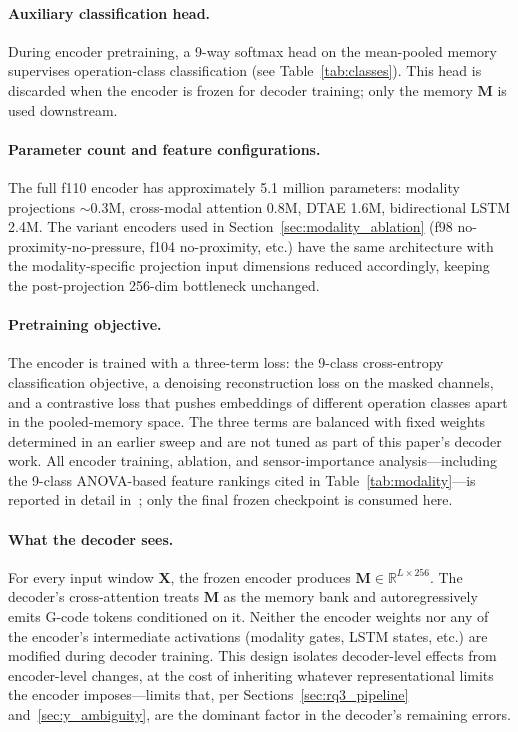 \documentclass[sensors,article,submit,moreauthors,pdftex]{Definitions/mdpi}
\begin{document}
\paragraph{Auxiliary classification head.} During encoder pretraining, a 9-way softmax head on the mean-pooled memory supervises operation-class classification (see Table~\ref{tab:classes}). This head is discarded when the encoder is frozen for decoder training; only the memory $\mathbf{M}$ is used downstream.

\paragraph{Parameter count and feature configurations.} The full f110 encoder has approximately 5.1 million parameters: modality projections $\sim$0.3M, cross-modal attention 0.8M, DTAE 1.6M, bidirectional LSTM 2.4M. The variant encoders used in Section~\ref{sec:modality_ablation} (f98 no-proximity-no-pressure, f104 no-proximity, etc.) have the same architecture with the modality-specific projection input dimensions reduced accordingly, keeping the post-projection 256-dim bottleneck unchanged.

\paragraph{Pretraining objective.} The encoder is trained with a three-term loss: the 9-class cross-entropy classification objective, a denoising reconstruction loss on the masked channels, and a contrastive loss that pushes embeddings of different operation classes apart in the pooled-memory space. The three terms are balanced with fixed weights determined in an earlier sweep and are not tuned as part of this paper's decoder work. All encoder training, ablation, and sensor-importance analysis---including the 9-class ANOVA-based feature rankings cited in Table~\ref{tab:modality}---is reported in detail in~\cite{encoder_paper}; only the final frozen checkpoint is consumed here.

\paragraph{What the decoder sees.} For every input window $\mathbf{X}$, the frozen encoder produces $\mathbf{M} \in \mathbb{R}^{L \times 256}$. The decoder's cross-attention treats $\mathbf{M}$ as the memory bank and autoregressively emits G-code tokens conditioned on it. Neither the encoder weights nor any of the encoder's intermediate activations (modality gates, LSTM states, etc.) are modified during decoder training. This design isolates decoder-level effects from encoder-level changes, at the cost of inheriting whatever representational limits the encoder imposes---limits that, per Sections~\ref{sec:rq3_pipeline} and~\ref{sec:y_ambiguity}, are the dominant factor in the decoder's remaining errors.
\end{document}
